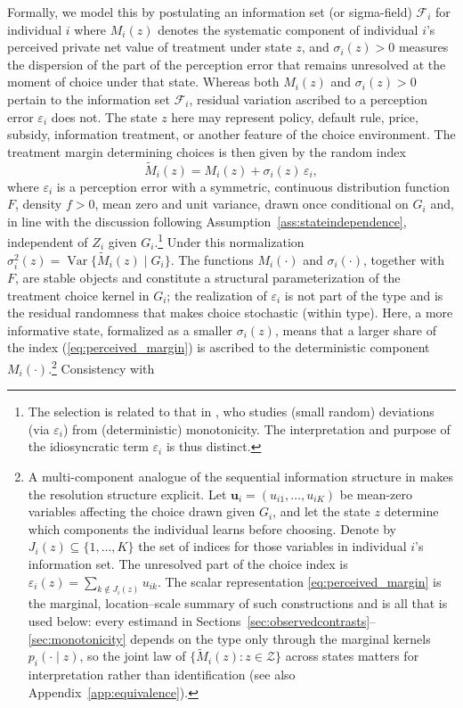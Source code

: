 \documentclass[11pt]{article}
\DeclareMathOperator{\Var}{Var}
\newcommand{\1}{\mathbf{1}}
\newcommand{\cZ}{\mathcal{Z}}
\begin{document}
Formally, we model this by postulating an information set (or sigma-field) $\mathcal{F}_i$ for individual $i$ where \(M_i(z)\) denotes the systematic component of individual
\(i\)'s perceived private net value of treatment under state \(z\), and
\(\sigma_i(z)>0\) measures the dispersion of the part of the perception error
that remains unresolved at the moment of choice under that state. Whereas both \(M_i(z)\) and \(\sigma_i(z)>0\) pertain to the information set $\mathcal{F}_i$, residual variation ascribed to a perception error $\varepsilon_i$ does not.  The state $z$ here
may represent policy, default rule, price, subsidy, information
treatment, or another feature of the choice environment. The 
treatment margin determining choices is then given by the random index
\begin{equation}
\widetilde M_i(z)
=
M_i(z)+\sigma_i(z)\,\varepsilon_i,
\label{eq:perceived_margin}
\end{equation}
where \(\varepsilon_i\) is a perception error with a symmetric, continuous
distribution function \(F\), density \(f>0\), mean zero and unit variance,
drawn once conditional on \(G_i\) and, in line with the discussion following
Assumption~\ref{ass:stateindependence}, independent of \(Z_i\) given
\(G_i\).\footnote{The selection is related to that in \cite{klein2011}, who studies (small random) deviations (via $\varepsilon_i$) from (deterministic) monotonicity. The interpretation and purpose of the idiosyncratic term $\varepsilon_i$ is thus distinct.} Under this normalization
\(\sigma_i^2(z)=\Var\{\widetilde M_i(z)\mid G_i\}\). The functions
\(M_i(\cdot)\) and \(\sigma_i(\cdot)\), together with \(F\), are stable
objects and constitute a structural parameterization of the treatment choice
kernel in \(G_i\); the realization of \(\varepsilon_i\) is not part of the
type and is the residual randomness that makes choice stochastic (within
type). Here, a more informative state,
formalized as a smaller \(\sigma_i(z)\), means that a larger share of the index (\ref{eq:perceived_margin}) is ascribed to the deterministic component \(M_i(\cdot)\).\footnote{A multi-component analogue of the sequential
information structure in \citet[Section VI]{heckmannavarro} makes the
resolution structure explicit. Let \(\mathbf u_i=(u_{i1},\ldots,u_{iK})\) be
 mean-zero variables affecting the choice drawn given \(G_i\),
and let the state $z$ determine which components the individual learns before choosing.  Denote by \(J_i(z)\subseteq\{1,\ldots,K\}\) the set of indices for those variables in individual $i$'s information set.  The unresolved part of the choice index is
\(\varepsilon_i(z)=\sum_{k\notin J_i(z)}u_{ik}\). The scalar representation \eqref{eq:perceived_margin} is the
marginal, location--scale summary of such constructions and is all that is
used below: every estimand in
Sections~\ref{sec:observedcontrasts}--\ref{sec:monotonicity} depends on the
type only through the marginal kernels \(p_i(\cdot\mid z)\), so the joint
law of \(\{\widetilde M_i(z):z\in\cZ\}\) across states matters for
interpretation rather than identification (see also
Appendix~\ref{app:equivalence}).} Consistency with
\end{document}
